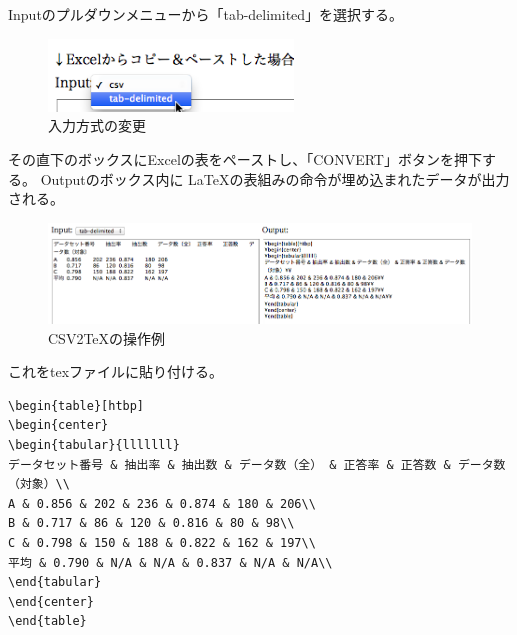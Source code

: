Inputのプルダウンメニューから「tab-delimited」を選択する。
\begin{figure}[H]
\centering
\includegraphics[width=6.5cm]{inputTypeChange.png}
\caption{入力方式の変更}
\label{fig:inputTypeChange}
\end{figure}



その直下のボックスにExcelの表をペーストし、「CONVERT」ボタンを押下する。
Outputのボックス内に \LaTeX の表組みの命令が埋め込まれたデータが出力される。
\begin{figure}[htb]
\centering
\includegraphics[width=14cm]{convertTable.png}
\caption{CSV2TeXの操作例}
\label{fig:convertTable}
\end{figure}

これをtexファイルに貼り付ける。
\begin{breakbox}
{\small
\begin{verbatim}
\begin{table}[htbp]
\begin{center}
\begin{tabular}{lllllll}
データセット番号 & 抽出率 & 抽出数 & データ数（全） & 正答率 & 正答数 & データ数（対象）\\
A & 0.856 & 202 & 236 & 0.874 & 180 & 206\\
B & 0.717 & 86 & 120 & 0.816 & 80 & 98\\
C & 0.798 & 150 & 188 & 0.822 & 162 & 197\\
平均 & 0.790 & N/A & N/A & 0.837 & N/A & N/A\\
\end{tabular}
\end{center}
\end{table}
\end{verbatim}
}
\end{breakbox}

